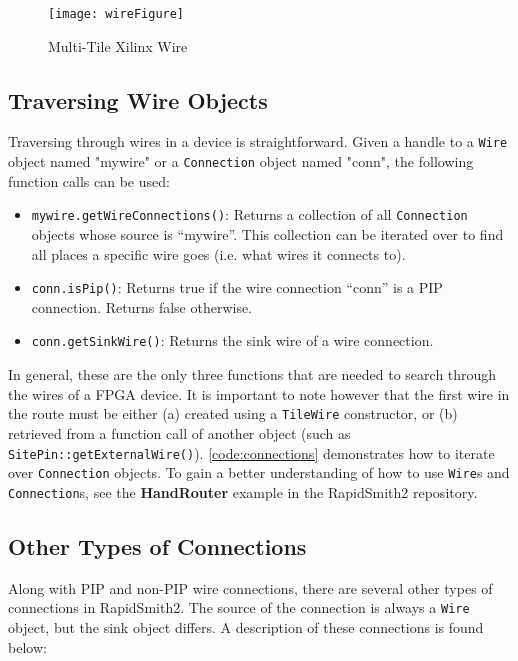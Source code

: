 \begin{figure}[h!]
\centering
\texttt{[image: wireFigure]}
\caption{Multi-Tile Xilinx Wire}
\label{fig:wireFigure}
\end{figure}

\subsection{Traversing Wire Objects}
Traversing through wires in a device is straightforward. Given a handle to a
\texttt{Wire} object named "mywire" or a \texttt{Connection} object named
"conn", the following function calls can be used:

\begin {itemize}
  \item \texttt{mywire.getWireConnections()}: Returns a collection of all
  \texttt{Connection} objects whose source is ``mywire''. This collection can
  be iterated over to find all places a specific wire goes (i.e. what wires it
  connects to).
  \item  \texttt{conn.isPip()}: Returns true if the wire connection ``conn'' is
  a PIP connection. Returns false otherwise.
  \item \texttt{conn.getSinkWire()}: Returns the sink wire of a wire connection.
\end{itemize} 

\noindent
In general, these are the only three functions that are needed to
search through the wires of a FPGA device. It is important to note however that
the first wire in the route must be either (a) created using a \texttt{TileWire}
constructor, or (b) retrieved from a function call of another object (such as
\texttt{SitePin::getExternalWire()}). \autoref{code:connections} demonstrates
how to iterate over \texttt{Connection} objects. To gain a better
understanding of how to use \texttt{Wire}s and \texttt{Connection}s, see the
\textbf{HandRouter} example in the RapidSmith2 repository.

\subsection{Other Types of Connections} \label{otherConns}
Along with PIP and non-PIP wire connections, there are several other types of
connections in RapidSmith2. The source of the connection is always a
\texttt{Wire} object, but the sink object differs. A description of these
connections is found below:

